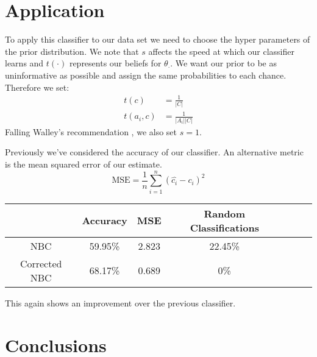 \section{Application}

To apply this classifier to our data set we need to choose the hyper parameters of the prior distribution.
We note that $s$ affects the speed at which our classifier learns and $t(\cdot)$ represents our beliefs for $\theta_\cdot$.
We want our prior to be as uninformative as possible and assign the same probabilities to each chance\cite{laplace1812}. Therefore we set:
\begin{align}
	t(c) & = \frac{1}{|C|} \\
	t(a_i, c) & = \frac{1}{|A_i||C|}
\end{align}
Falling Walley's recommendation \cite{Walley96}, we also set $s=1$.

Previously we've considered the accuracy of our classifier.
An alternative metric is the mean squared error of our estimate.
\begin{equation}
	\text{MSE} = \frac{1}{n}\sum_{i=1}^n(\hat{c_i} - c_i)^2
\end{equation}

\begin{center}
	\begin{tabular}{ c|c c c c c c }
		              & Accuracy & MSE   & Random Classifications\\
		\hline
		NBC           & 59.95\%  & 2.823 & 22.45\% \\
		Corrected NBC & 68.17\%  & 0.689 & 0\%
	\end{tabular}
\end{center}

This again shows an improvement over the previous classifier.

\section{Conclusions}